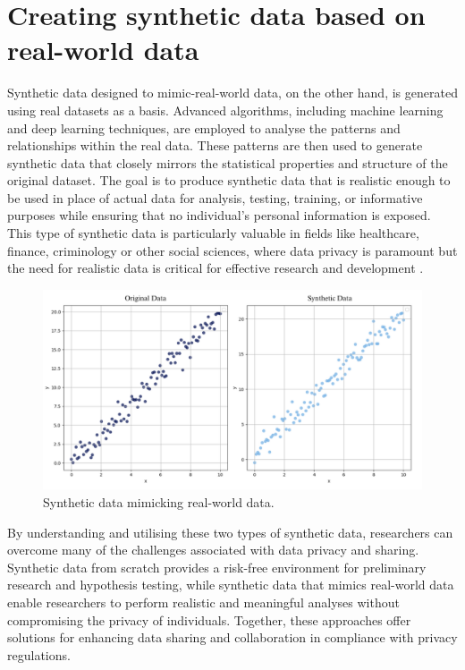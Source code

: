 \section{Creating synthetic data based on real-world data}
Synthetic data designed to mimic-real-world data, on the other hand, is generated using real datasets as a basis. Advanced algorithms, including machine learning and deep learning techniques, are employed to analyse the patterns and relationships within the real data. These patterns are then used to generate synthetic data that closely mirrors the statistical properties and structure of the original dataset. The goal is to produce synthetic data that is realistic enough to be used in place of actual data for analysis, testing, training, or informative purposes while ensuring that no individual's personal information is exposed. This type of synthetic data is particularly valuable in fields like healthcare, finance, criminology or other social sciences, where data privacy is paramount but the need for realistic data is critical for effective research and development \cite{arnold2020really, jordon2022synthetic}. \\

\vspace{10pt}
\begin{figure}[H]
    \centering
    \includegraphics[width=\textwidth]{Images/Screenshot 2024-08-06 at 12.32.53.png}
    \caption{Synthetic data mimicking real-world data.}
    \label{fig:synthesis_2}
\end{figure} 
\vspace{10pt}


By understanding and utilising these two types of synthetic data, researchers can overcome many of the challenges associated with data privacy and sharing. Synthetic data from scratch provides a risk-free environment for preliminary research and hypothesis testing, while synthetic data that mimics real-world data enable researchers to perform realistic and meaningful analyses without compromising the privacy of individuals. Together, these approaches offer solutions for enhancing data sharing and collaboration in compliance with privacy regulations. 

